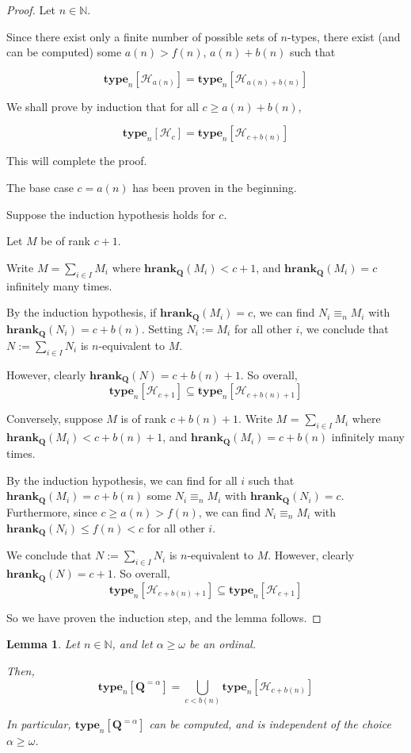 \documentclass{article}
\newtheorem{lemma}{Lemma}
\newcommand{\brackets}[1]{\left[ {#1} \right]}
\newcommand{\hrank}[1]{\mathbf{hrank}_{\qq}\left( #1 \right)}
\newcommand{\qq}{\mathbf{Q}}
\newcommand{\NN}{\mathbb{N}}
\newcommand{\type}[2]{\mathbf{type}_{#1} \brackets{#2}}
\begin{document}
\begin{proof}
  Let $n \in \NN$.

  Since there exist only a finite number of possible
  sets of $n$-types, there exist (and can be computed)
  some $a(n) > f(n)$, $a(n) + b(n)$ such that

  $$\type{n}{\mathcal{H}_{a(n)}} = \type{n}{\mathcal{H}_{a(n) + b(n)}}$$

  We shall prove by induction that for all $c \ge a(n) + b(n)$,

  $$\type{n}{\mathcal{H}_{c}} = \type{n}{\mathcal{H}_{c + b(n)}}$$

  This will complete the proof.

  The base case $c = a(n)$ has been proven in the beginning.

  Suppose the induction hypothesis holds for $c$.

  Let $M$ be of rank $c + 1$.

  Write $M = \sum_{i \in I} M_i$ where $\hrank{M_i} < c + 1$,
  and $\hrank{M_i} = c$ infinitely many times.

  By the induction hypothesis,
  if $\hrank{M_i} = c$, we can find $N_i \equiv_n M_i$ with $\hrank{N_i} = c + b(n)$.
  Setting $N_i := M_i$ for all other $i$, we conclude that $N := \sum_{i \in I} N_i$
  is $n$-equivalent to $M$.

  However, clearly $\hrank{N} = c + b(n) + 1$. So overall,
  $$\type{n}{\mathcal{H}_{c + 1}} \subseteq \type{n}{\mathcal{H}_{c + b(n) + 1}}$$

  Conversely, suppose $M$ is of rank $c + b(n) + 1$.
  Write $M$ = $\sum_{i \in I} M_i$ where $\hrank{M_i} < c + b(n) + 1$,
  and $\hrank{M_i} = c + b(n)$ infinitely many times.

  By the induction hypothesis,
  we can find for all $i$ such that $\hrank{M_i} = c + b(n)$ some
  $N_i \equiv_n M_i$ with $\hrank{N_i} = c$.
  Furthermore, since $c \ge a(n) > f(n)$, we can
  find $N_i \equiv_n M_i$ with $\hrank{N_i} \le f(n) < c$ for all other $i$.

  We conclude that $N := \sum_{i \in I} N_i$ is $n$-equivalent to $M$.
  However, clearly $\hrank{N} = c + 1$. So overall,
  $$\type{n}{\mathcal{H}_{c + b(n) + 1}} \subseteq \type{n}{\mathcal{H}_{c + 1}}$$

  So we have proven the induction step, and the lemma follows.
\end{proof}

\begin{lemma}
  Let $n \in \NN$, and let $\alpha \ge \omega$ be an ordinal.

  Then,
  $$\type{n}{\qq^{= \alpha}} = \bigcup_{c < b(n)}{\type{n}{\mathcal{H}_{c + b(n)}}}$$

  In particular, $\type{n}{\qq^{= \alpha}}$ can be
  computed, and is independent of the choice $\alpha \ge \omega$.
\end{lemma}
\end{document}
